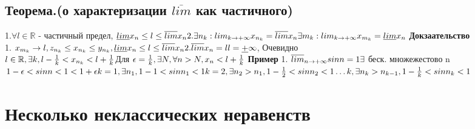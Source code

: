 \documentclass[12pt, a4paper]{article}
\begin{document}
	\subsection{Теорема.(о характеризации $ \overline{lim} $ как частичного)}
	1.$ \forall l \in \mathbb{R} $ - частичный предел,  $ \underline{lim} x_n \leq l \leq \overline{lim} x_n \\
	2. \exists n_k : lim_{k \rightarrow +\infty} x_{n_k}=\overline{lim} x_n\\
	\exists m_k : lim_{k \rightarrow +\infty} x_{m_k}=\underline{lim} x_n \\$
	\textbf{Докзаательство}\\
	1. $ x_{m_k} \rightarrow l,  z_{n_k} \leq x_{n_k} \leq y_{n_k} , \underline{lim}x_n \leq l \leq \overline{lim} x_n \\
	2. \overline{lim} x_n = l \\
	l =  \underline{+} \infty $, Очевидно \\
	$ l \in \mathbb{R}, \exists k , l - \frac{1}{k} < x_{n_k}< l +\frac{1}{k}\\
	$Для  $ \epsilon = \frac{1}{k} , \exists N, \forall n > N,  x_n < l + \frac{1}{k} \\$
	\textbf{Пример}
	1. $ \overline{lim}_{n \rightarrow +\infty} sin n = 1 \\
	\exists$ беск. множежестово n $ 1- \epsilon < sin n < 1 < 1+ \epsilon \\
	k=1 , \exists n_1 , 1-1 < sin n _1 < 1 \\
	k = 2, \exists n_2> n_1,  1- \frac{1}{2}< sin n_2 < 1 \\
	\dots \\
	k,  \exists n_k > n_{k-1}, 1- \frac{1}{k} < sin n_k < 1 $
	\section{Несколько неклассических неравенств}
\end{document}
